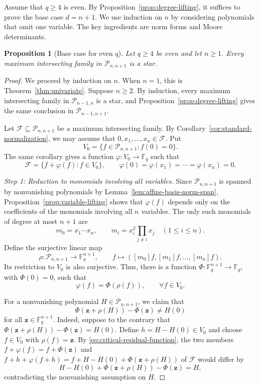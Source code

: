\documentclass[12pt,reqno]{amsart}
\newtheorem{prop}[thm]{Proposition}
\theoremstyle{definition}
\newcommand{\F}{\mathbb{F}}
\newcommand{\cF}{\mathcal F}
\newcommand{\cP}{\mathcal P}
\begin{document}
Assume that $q\geq 4$ is even. By
Proposition~\ref{prop:degree-lifting}, it suffices to prove the
base case $d=n+1$. We use induction on $n$ by considering polynomials that omit one variable. The key ingredients are norm forms and Moore determinants.

\begin{prop}[Base case for even $q$]\label{prop:critical-even}
Let $q\geq4$ be even and let $n\geq1$. Every maximum intersecting
family in $\cP_{n,n+1}$ is a star.
\end{prop}

\begin{proof}
We proceed by induction on $n$. When $n=1$, this is
Theorem~\ref{thm:univariate}. Suppose $n\geq2$. By induction, every
maximum intersecting family in $\cP_{n-1,n}$ is a star, and
Proposition~\ref{prop:degree-lifting} gives the same conclusion in
$\cP_{n-1,n+1}$.

Let $\cF\subseteq\cP_{n,n+1}$ be a maximum intersecting family. By
Corollary~\ref{cor:standard-normalization}, we may assume that $ 0,x_1,\ldots,x_n\in\cF$. 
Put
\[
  V_0=\{f\in\cP_{n,n+1}:f(0)=0\}.
\]
The same corollary gives a function $\varphi\colon V_0\to\F_q$ such that
\begin{equation}\label{eq:critical-selector}
  \cF=\{f+\varphi(f):f\in V_0\},
  \qquad \varphi(0)=\varphi(x_1)=\cdots=\varphi(x_n)=0.
\end{equation}

\smallskip
\noindent\emph{Step 1: Reduction to monomials involving all variables.} Since $\cP_{n,n+1}$ is spanned by nonvanishing polynomials by
Lemma~\ref{lem:affine-basis-norm-span},
Proposition~\ref{prop:variable-lifting} shows that $\varphi(f)$ depends only
on the coefficients of the monomials involving all $n$ variables. The only such monomials of degree at most $n+1$ are
\[
  m_0=x_1\cdots x_n,
  \qquad
  m_i=x_i^2\prod_{j\neq i}x_j\quad(1\leq i\leq n).
\]
Define the surjective linear map
\[
\rho:\cP_{n,n+1}\to\F_q^{n+1},
  \qquad
  f \mapsto ([m_0]f,[m_1]f,\ldots,[m_n]f).
\]
Its restriction to $V_0$ is also surjective.
Thus, there is a function $\Phi\colon\F_q^{n+1}\to\F_q$, with
$\Phi(0)=0$, such that
\begin{equation}\label{eq:critical-residual-function}
  \varphi(f)=\Phi(\rho(f)), \qquad \forall f\in V_0.
\end{equation}

For a nonvanishing polynomial $H\in\cP_{n,n+1}$, we claim that
\begin{equation}\label{eq:critical-forbidden-value}
  \Phi(\mathbf z+\rho(H))-\Phi(\mathbf z)\neq H(0)
\end{equation}
for all $\mathbf z\in\F_q^{n+1}$.  Indeed, suppose to the contrary that $\Phi(\mathbf z+\rho(H))-\Phi(\mathbf z)=H(0)$. Define $h=H-H(0)\in V_0$ and choose $f\in V_0$ with $\rho(f)=\mathbf{z}$. By
\eqref{eq:critical-residual-function}, the two members $f+\varphi(f)=f+\Phi(\mathbf{z})$ and $f+h+\varphi(f+h)=f+H-H(0)+\Phi(\mathbf{z}+\rho(H))$ of $\cF$ would differ by
\[
  H-H(0)+\Phi(\mathbf z+\rho(H))-\Phi(\mathbf z)=H,
\]
contradicting the nonvanishing assumption on $H$.


\end{proof}
\end{document}
